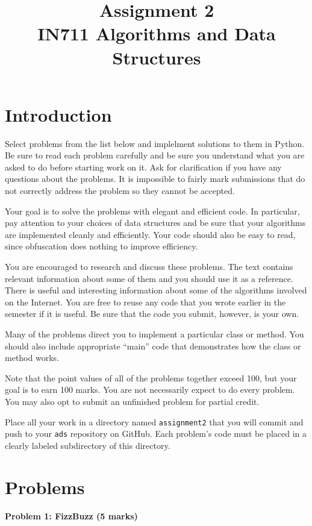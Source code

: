 \documentclass{article}
\begin{document}
\title{Assignment 2 \\ IN711 Algorithms and Data Structures}
\date{}
\maketitle

\section*{Introduction}
Select problems from the list below and implelment solutions to them in Python. Be sure to read each problem carefully and be sure you understand what you are asked to do before starting work on it. Ask for clarification if you have any questions about the problems. It is impossible to fairly mark submissions that do not correctly address the problem so they cannot be accepted.

Your goal is to solve the problems with elegant and efficient code.  In particular, pay attention to your choices of data structures and be sure that your algorithms are implemented cleanly and efficiently.  Your code should also be easy to read, since obfuscation does nothing to improve efficiency.

You are encouraged to research and discuss these problems.  The text contains relevant information about some of them and you should use it as a reference. There is useful and interesting information about some of the algorithms involved on the Internet.  You are free to reuse any code that you wrote earlier in the semester if it is useful. Be sure that the code you submit, however, is your own. 

Many of the problems direct you to implement a particular class or method.  You should also include appropriate ``main'' code that demonstrates how the class or method works. 

Note that the point values of all of the problems together exceed 100, but your goal is to earn 100 marks.  You are not necessarily expect to do every problem.  You may also opt to submit an unfinished problem for partial credit.

Place all your work in a directory named \texttt{assignment2} that you will commit and push to your \texttt{ads} repository on GitHub.  Each problem's code must be placed in a clearly labeled subdirectory of this directory.

\section{Problems}
\textbf{Problem 1: FizzBuzz (5 marks)}
\end{document}

